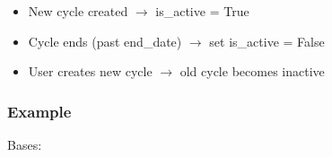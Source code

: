 \documentclass[letterpaper,10pt,english]{sphinxmanual}
\begin{document}
\begin{fulllineitems}
\begin{fulllineitems}
\begin{description}
\begin{itemize}
\item {} 
\sphinxAtStartPar
New cycle created \(\rightarrow\) is\_active = True

\item {} 
\sphinxAtStartPar
Cycle ends (past end\_date) \(\rightarrow\) set is\_active = False

\item {} 
\sphinxAtStartPar
User creates new cycle \(\rightarrow\) old cycle becomes inactive

\end{itemize}

\end{description}
\subsubsection*{Example}

\begin{sphinxVerbatim}[commandchars=\\\{\}]
  
    
\end{sphinxVerbatim}

\end{fulllineitems}


\begin{fulllineitems}
\label{\detokenize{expensesApp:expensesApp.models.Cycle.DoesNotExist}}
\pysigstartsignatures
\pysigline
{}
\pysigstopsignatures
\sphinxAtStartPar
Bases: 

\end{fulllineitems}



\end{fulllineitems}
\end{document}
